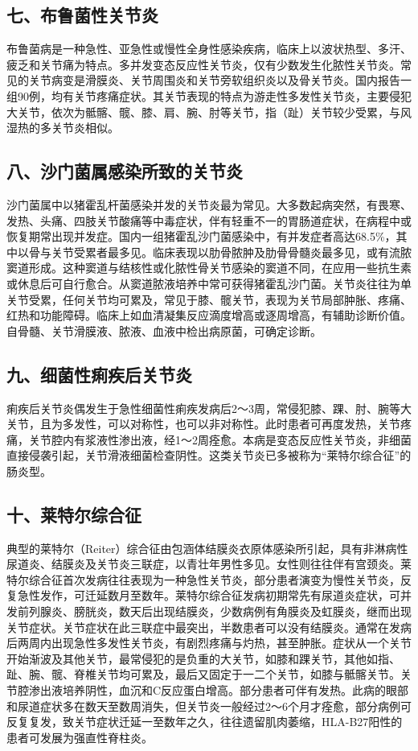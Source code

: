 \subsection{七、布鲁菌性关节炎}

布鲁菌病是一种急性、亚急性或慢性全身性感染疾病，临床上以波状热型、多汗、疲乏和关节痛为特点。多并发变态反应性关节炎，仅有少数发生化脓性关节炎。常见的关节病变是滑膜炎、关节周围炎和关节旁软组织炎以及骨关节炎。国内报告一组90例，均有关节疼痛症状。其关节表现的特点为游走性多发性关节炎，主要侵犯大关节，依次为骶髂、髋、膝、肩、腕、肘等关节，指（趾）关节较少受累，与风湿热的多关节炎相似。

\subsection{八、沙门菌属感染所致的关节炎}

沙门菌属中以猪霍乱杆菌感染并发的关节炎最为常见。大多数起病突然，有畏寒、发热、头痛、四肢关节酸痛等中毒症状，伴有轻重不一的胃肠道症状，在病程中或恢复期常出现并发症。国内一组猪霍乱沙门菌感染中，有并发症者高达68.5\%，其中以骨与关节受累者最多见。临床表现以肋骨脓肿及肋骨骨髓炎最多见，或有流脓窦道形成。这种窦道与结核性或化脓性骨关节感染的窦道不同，在应用一些抗生素或休息后可自行愈合。从窦道脓液培养中常可获得猪霍乱沙门菌。关节炎往往为单关节受累，任何关节均可累及，常见于膝、髋关节，表现为关节局部肿胀、疼痛、红热和功能障碍。临床上如血清凝集反应滴度增高或逐周增高，有辅助诊断价值。自骨髓、关节滑膜液、脓液、血液中检出病原菌，可确定诊断。

\subsection{九、细菌性痢疾后关节炎}

痢疾后关节炎偶发生于急性细菌性痢疾发病后2～3周，常侵犯膝、踝、肘、腕等大关节，且为多发性，可以对称性，也可以非对称性。此时患者可再度发热，关节疼痛，关节腔内有浆液性渗出液，经1～2周痊愈。本病是变态反应性关节炎，非细菌直接侵袭引起，关节滑液细菌检查阴性。这类关节炎已多被称为“莱特尔综合征”的肠炎型。

\subsection{十、莱特尔综合征}

典型的莱特尔（Reiter）综合征由包涵体结膜炎衣原体感染所引起，具有非淋病性尿道炎、结膜炎及关节炎三联症，以青壮年男性多见。女性则往往伴有宫颈炎。莱特尔综合征首次发病往往表现为一种急性关节炎，部分患者演变为慢性关节炎，反复急性发作，可迁延数月至数年。莱特尔综合征发病初期常先有尿道炎症状，可并发前列腺炎、膀胱炎，数天后出现结膜炎，少数病例有角膜炎及虹膜炎，继而出现关节症状。关节症状在此三联症中最突出，半数患者可以没有结膜炎。通常在发病后两周内出现急性多发性关节炎，有剧烈疼痛与灼热，甚至肿胀。症状从一个关节开始渐波及其他关节，最常侵犯的是负重的大关节，如膝和踝关节，其他如指、趾、腕、髋、脊椎关节均可累及，最后又固定于一二个关节，如膝与骶髂关节。关节腔渗出液培养阴性，血沉和C反应蛋白增高。部分患者可伴有发热。此病的眼部和尿道症状多在数天至数周消失，但关节炎一般经过2～6个月才痊愈，部分病例可反复复发，致关节症状迁延一至数年之久，往往遗留肌肉萎缩，HLA-B27阳性的患者可发展为强直性脊柱炎。

